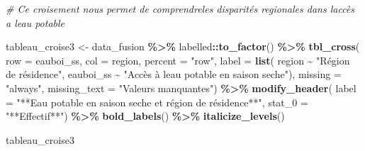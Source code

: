 \documentclass[
]{article}
\newenvironment{Shaded}{\begin{snugshade}}{\end{snugshade}}
\newcommand{\AttributeTok}[1]{\textcolor[rgb]{0.13,0.29,0.53}{#1}}
\newcommand{\CommentTok}[1]{\textcolor[rgb]{0.56,0.35,0.01}{\textit{#1}}}
\newcommand{\FunctionTok}[1]{\textcolor[rgb]{0.13,0.29,0.53}{\textbf{#1}}}
\newcommand{\NormalTok}[1]{#1}
\newcommand{\OtherTok}[1]{\textcolor[rgb]{0.56,0.35,0.01}{#1}}
\newcommand{\SpecialCharTok}[1]{\textcolor[rgb]{0.81,0.36,0.00}{\textbf{#1}}}
\newcommand{\StringTok}[1]{\textcolor[rgb]{0.31,0.60,0.02}{#1}}
\begin{document}
\begin{Shaded}
\begin{Highlighting}[]
\CommentTok{\# Ce croisement nous permet de comprendreles disparités regionales dans l\textquotesingle{}accès a l\textquotesingle{}eau potable}

\NormalTok{tableau\_croise3 }\OtherTok{\textless{}{-}}\NormalTok{ data\_fusion }\SpecialCharTok{\%\textgreater{}\%}
\NormalTok{  labelled}\SpecialCharTok{::}\FunctionTok{to\_factor}\NormalTok{() }\SpecialCharTok{\%\textgreater{}\%}  
  \FunctionTok{tbl\_cross}\NormalTok{(}
    \AttributeTok{row =}\NormalTok{ eauboi\_ss,  }
    \AttributeTok{col =}\NormalTok{ region,  }
    \AttributeTok{percent =} \StringTok{"row"}\NormalTok{,  }
    \AttributeTok{label =} \FunctionTok{list}\NormalTok{(}
\NormalTok{      region }\SpecialCharTok{\textasciitilde{}} \StringTok{"Région de résidence"}\NormalTok{,  }
\NormalTok{      eauboi\_ss }\SpecialCharTok{\textasciitilde{}} \StringTok{"Accès à l\textquotesingle{}eau potable en saison seche"}\NormalTok{),}
    \AttributeTok{missing =} \StringTok{"always"}\NormalTok{,  }
    \AttributeTok{missing\_text =} \StringTok{"Valeurs manquantes"}\NormalTok{) }\SpecialCharTok{\%\textgreater{}\%}
  \FunctionTok{modify\_header}\NormalTok{(}
    \AttributeTok{label =} \StringTok{"**Eau potable en saison seche et région de résidence**"}\NormalTok{,}
    \AttributeTok{stat\_0 =} \StringTok{"**Effectif**"}\NormalTok{) }\SpecialCharTok{\%\textgreater{}\%}
  \FunctionTok{bold\_labels}\NormalTok{() }\SpecialCharTok{\%\textgreater{}\%}  
  \FunctionTok{italicize\_levels}\NormalTok{()}

\NormalTok{tableau\_croise3}
\end{Highlighting}
\end{Shaded}
\end{document}
